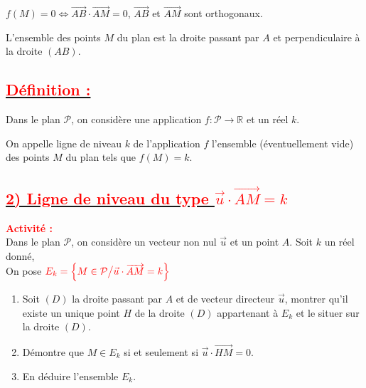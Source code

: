 \documentclass[12pt,a4paper]{article}
\begin{document}
$f(M) = 0 \iff \overrightarrow{AB} \cdot \overrightarrow{AM} = 0$, $\overrightarrow{AB}$ et $\overrightarrow{AM}$ sont orthogonaux.

L'ensemble des points $M$ du plan est la droite passant par $A$ et perpendiculaire à la droite $(AB)$.

\subsection*{\underline{\textbf{\textcolor{red}{Définition :}}}}

Dans le plan $\mathcal{P}$, on considère une application $f : \mathcal{P} \longrightarrow \mathbb{R}$ et un réel $k$.

On appelle ligne de niveau $k$ de l'application $f$ l'ensemble (éventuellement vide) des points $M$ du plan tels que $f(M) = k$.

\subsection*{\underline{\textbf{\textcolor{red}{2) Ligne de niveau du type $\vec{u} \cdot \overrightarrow{AM} = k$}}}}

\textbf{\textcolor{red}{Activité :}} \\
Dans le plan $\mathcal{P}$, on considère un vecteur non nul $\vec{u}$ et un point $A$. Soit $k$ un réel donné, \\
On pose $\textcolor{red}{E_k = \left\{ M \in \mathcal{P} \big/ \vec{u} \cdot \overrightarrow{AM} = k \right\}}$

\begin{enumerate}
    \item Soit $(D)$ la droite passant par $A$ et de vecteur directeur $\vec{u}$, montrer qu'il existe un unique point $H$ de la droite $(D)$ appartenant à $E_k$ et le situer sur la droite $(D)$.
    \item Démontre que $M \in E_k$ si et seulement si $\vec{u} \cdot \overrightarrow{HM} = 0$.
    \item En déduire l'ensemble $E_k$.
\end{enumerate}
\end{document}
